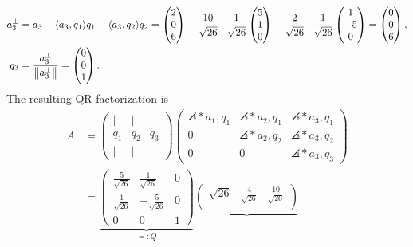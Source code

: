 \documentclass{exercise}
\begin{document}
\begin{enumerate}
\begin{align*}
			a_3^\bot &= a_3 - \angles*{a_3, q_1}q_1 - \angles*{a_3, q_2}q_2 = \begin{pmatrix}
				2\\
				0\\
				6
			\end{pmatrix} - \frac{10}{\sqrt{26}} \cdot \frac{1}{\sqrt{26}}\begin{pmatrix}
				5\\
				1\\
				0
			\end{pmatrix} - \frac{2}{\sqrt{26}} \cdot \frac{1}{\sqrt{26}}\begin{pmatrix}
				1\\
				-5\\
				0
			\end{pmatrix} = \begin{pmatrix}
				0\\
				0\\
				6
			\end{pmatrix},\\
			q_3 &= \frac{a_3^\bot}{\norm*{a_3^\bot}} = \begin{pmatrix}
				0\\
				0\\
				1
			\end{pmatrix}.
		\end{align*}
		The resulting QR-factorization is
		\begin{align*}
			A &= \begin{pmatrix}
				\vert & \vert & \vert\\
				q_1 & q_2 & q_3\\
				\vert & \vert & \vert
			\end{pmatrix}\begin{pmatrix}
				\angles*{a_1, q_1} & \angles*{a_2, q_1} & \angles*{a_3, q_1}\\
				0 & \angles*{a_2, q_2} & \angles*{a_3, q_2}\\
				0 & 0 & \angles*{a_3, q_3}
			\end{pmatrix}\\
			&= \underbrace{\begin{pmatrix}
				\frac{5}{\sqrt{26}} & \frac{1}{\sqrt{26}} & 0\\
				\frac{1}{\sqrt{26}} & -\frac{5}{\sqrt{26}} & 0\\
				0 & 0 & 1
			\end{pmatrix}}_{=: Q}\underbrace{\begin{pmatrix}
				\sqrt{26} & \frac{4}{\sqrt{26}} & \frac{10}{\sqrt{26}}\\

\end{pmatrix}}
\end{align*}
\end{enumerate}
\end{document}
